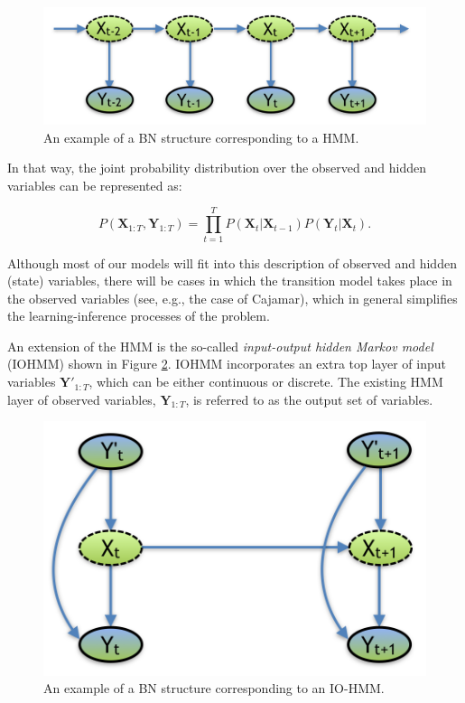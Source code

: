 \begin{figure}[ht!]
\begin{center}
\includegraphics[scale=0.4]{./figures/PreliminariesHMM}
\caption{\label{Figure:HMM}An example of a BN structure corresponding to a HMM.}
\end{center}
\end{figure}

In that way, the joint probability distribution over the observed and hidden variables can be represented as:

\begin{equation}
P(\bm X_{1:T},\bm Y_{1:T}) = \prod_{t=1}^T{P(\bm X_t| \bm X_{t-1})P(\bm Y_t|\bm X_t)}.
\end{equation}

Although most of our models will fit into this description of observed and hidden (state) variables, there will be cases in which the transition model takes place in the observed variables (see, e.g., the case of Cajamar), which in general simplifies the learning-inference processes of the problem.

An extension of the HMM is the so-called \textit{input-output hidden Markov model} (IOHMM) shown in Figure \ref{Figure:IO-HMM}. IOHMM incorporates an extra top layer of input variables $\bm Y'_{1:T}$, which can be either continuous or discrete. The existing HMM layer of observed variables, $\bm Y_{1:T}$, is referred to as the output set of variables. 

\begin{figure}[ht!]
\begin{center}
\includegraphics[scale=0.4]{./figures/PreliminariesIO-HMM}
\caption{\label{Figure:IO-HMM}An example of a BN structure corresponding to an IO-HMM.}
\end{center}
\end{figure}

